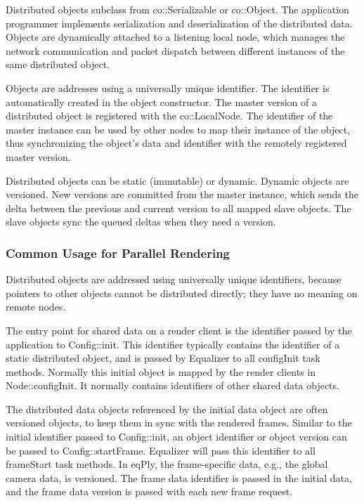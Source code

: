 \documentclass[10pt,a4]{scrartcl}
\begin{document}
Distributed objects subclass from \textsf{co::Serializable} or
\textsf{co::Object}. The application programmer implements serialization and
deserialization of the distributed data. Objects are dynamically attached to a
listening local node, which manages the network communication and packet
dispatch between different instances of the same distributed object.

Objects are addresses using a universally unique identifier. The identifier is
automatically created in the object constructor. The master version of a
distributed object is registered with the \textsf{co::LocalNode}. The identifier
of the master instance can be used by other nodes to map their instance of the
object, thus synchronizing the object's data and identifier with the remotely
registered master version.

Distributed objects can be static (immutable) or dynamic. Dynamic objects are
versioned. New versions are committed from the master instance, which sends
the delta between the previous and current version to all mapped slave
objects. The slave objects sync the queued deltas when they need a version.

\subsubsection{Common Usage for Parallel Rendering}

Distributed objects are addressed using universally unique identifiers, because
pointers to other objects cannot be distributed directly; they have no meaning
on remote nodes.

The entry point for shared data on a render client is the identifier passed by
the application to \textsf{Config::init}. This identifier typically contains the
identifier of a static distributed object, and is passed by Equalizer to all
\textsf{configInit} task methods. Normally this initial object is mapped by the
render clients in \textsf{Node::configInit}. It normally contains identifiers of
other shared data objects.

The distributed data objects referenced by the initial data object are
often versioned objects, to keep them in sync with the rendered
frames. Similar to the initial identifier passed to
\textsf{Config::init}, an object identifier or object version can be
passed to \textsf{Config::startFrame}. Equalizer will pass this
identifier to all \textsf{frameStart} task methods. In \textsf{eqPly},
the frame-specific data, e.g., the global camera data, is versioned. The
frame data identifier is passed in the initial data, and the frame data
version is passed with each new frame request.
\end{document}
